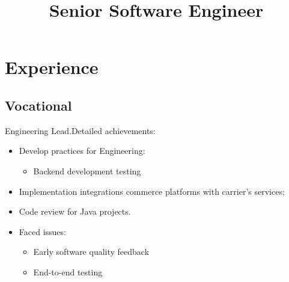 \documentclass[11pt, a4paper]{moderncv}
\title{Senior Software Engineer}
\begin{document}
\makecvtitle

\section{Experience}
\subsection{Vocational}

{Engineering Lead.\newline{}Detailed achievements:
\begin{itemize}
\item Develop practices for Engineering:
\begin{itemize}
\item Backend development testing
\end{itemize}
\item Implementation integrations commerce platforms with carrier's services;
\item Code review for Java projects.
\item Faced issues:
\begin{itemize}
\item Early software quality feedback
\item End-to-end testing
\end{itemize}


\end{itemize}}
\end{document}
